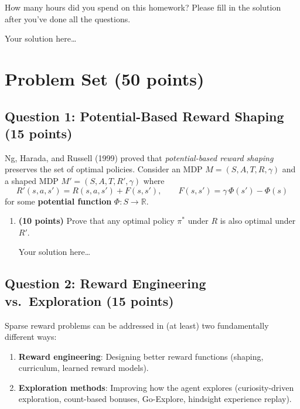 \documentclass[11pt]{article}
\begin{document}
How many hours did you spend on this homework?  Please fill in the
solution after you've done all the questions.

\begin{solution}
Your solution here\ldots
\end{solution}

\section*{Problem Set (50 points)}

\subsection*{Question 1: Potential-Based Reward Shaping (15 points)}

Ng, Harada, and Russell (1999) proved that \emph{potential-based reward
shaping} preserves the set of optimal policies.  Consider an MDP
$M = (S, A, T, R, \gamma)$ and a shaped MDP
$M' = (S, A, T, R', \gamma)$ where
\[
  R'(s,a,s') = R(s,a,s') + F(s,s'),
  \qquad
  F(s,s') = \gamma\,\Phi(s') - \Phi(s)
\]
for some \textbf{potential function} $\Phi: S \to \mathbb{R}$.

\begin{enumerate}[label=(\alph*)]
\item \textbf{(10 points)} Prove that any optimal policy $\pi^*$ under $R$
is also optimal under $R'$.

\begin{solution}
Your solution here\ldots
\end{solution}

\end{enumerate}

\subsection*{Question 2: Reward Engineering vs.\ Exploration (15 points)}

Sparse reward problems can be addressed in (at least) two fundamentally
different ways:
\begin{enumerate}[label=(\roman*)]
  \item \textbf{Reward engineering}: Designing better reward functions
        (shaping, curriculum, learned reward models).
  \item \textbf{Exploration methods}: Improving how the agent explores
        (curiosity-driven exploration, count-based bonuses, Go-Explore,
        hindsight experience replay).
\end{enumerate}
\end{document}
